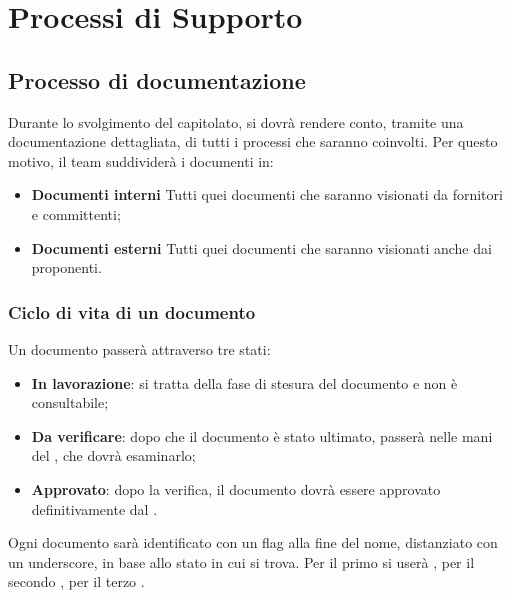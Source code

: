 \newpage
\section{Processi di Supporto}
\subsection{Processo di documentazione}
Durante lo svolgimento del capitolato, si dovrà rendere conto, tramite una documentazione dettagliata, di tutti i processi che saranno coinvolti. 
Per questo motivo, il team suddividerà i documenti in:
\begin{itemize}
	\item \textbf{Documenti interni}
	\newline Tutti quei documenti che saranno visionati da fornitori e committenti;
	\item \textbf{Documenti esterni}
	\newline Tutti quei documenti che saranno visionati anche dai proponenti.
	
\end{itemize}
	
	\subsubsection{Ciclo di vita di un documento}
	Un documento passerà attraverso tre stati:
	\begin{itemize}
		\item \textbf{In lavorazione}:
		si tratta della fase di stesura del documento e non è consultabile;
		\item \textbf{Da verificare}:
		dopo che il documento è stato ultimato, passerà nelle mani del \ver, che dovrà esaminarlo;
		\item \textbf{Approvato}:
		dopo la verifica, il documento dovrà essere approvato definitivamente dal \RdP.
	\end{itemize}
	Ogni documento sarà identificato con un flag alla fine del nome, distanziato con un underscore, in base allo stato in cui si trova. 
	Per il primo si userà \emph{}, per il secondo \emph{}, per il terzo \emph{}.
	

